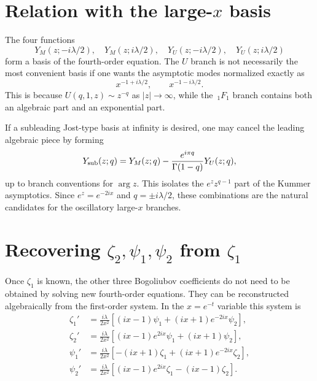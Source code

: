 \documentclass[%
 aip,
 jmp,%
 amsmath,amssymb,
 reprint,%
]{revtex4-2}
\begin{document}
\section{Relation with the large-$x$ basis}

The four functions
\begin{equation}
Y_M(z;-i\lambda/2),\quad
Y_M(z;i\lambda/2),\quad
Y_U(z;-i\lambda/2),\quad
Y_U(z;i\lambda/2)
\end{equation}
form a basis of the fourth-order equation.  The $U$ branch is not necessarily
the most convenient basis if one wants the asymptotic modes normalized exactly
as
\begin{equation}
x^{-1+i\lambda/2},\qquad x^{-1-i\lambda/2}.
\end{equation}
This is because $U(q,1,z)\sim z^{-q}$ as $|z|\to\infty$, while the
$\,_1F_1$ branch contains both an algebraic part and an exponential part.

If a subleading Jost-type basis at infinity is desired, one may cancel the
leading algebraic piece by forming
\begin{equation}
\label{eq:jostcomb}
Y_{\rm sub}(z;q)
=Y_M(z;q)
-\frac{e^{i\pi q}}{\Gamma(1-q)}Y_U(z;q),
\end{equation}
up to branch conventions for $\arg z$.  This isolates the
$e^z z^{q-1}$ part of the Kummer asymptotics.  Since $e^z=e^{-2ix}$ and
$q=\pm i\lambda/2$, these combinations are the natural candidates for the
oscillatory large-$x$ branches.

\section{Recovering $\zeta_2,\psi_1,\psi_2$ from $\zeta_1$}

Once $\zeta_1$ is known, the other three Bogoliubov coefficients do not need to
be obtained by solving new fourth-order equations.  They can be reconstructed
algebraically from the first-order system.  In the $x=e^{-t}$ variable this
system is
\begin{equation}
\label{eq:firstordersystem}
\begin{aligned}
\zeta_1'
&=
\frac{i\lambda}{2x^2}
\left[(ix-1)\psi_1+(ix+1)e^{-2ix}\psi_2\right],\\
\zeta_2'
&=
\frac{i\lambda}{2x^2}
\left[(ix-1)e^{2ix}\psi_1+(ix+1)\psi_2\right],\\
\psi_1'
&=
\frac{i\lambda}{2x^2}
\left[-(ix+1)\zeta_1+(ix+1)e^{-2ix}\zeta_2\right],\\
\psi_2'
&=
\frac{i\lambda}{2x^2}
\left[(ix-1)e^{2ix}\zeta_1-(ix-1)\zeta_2\right].
\end{aligned}
\end{equation}
\end{document}
